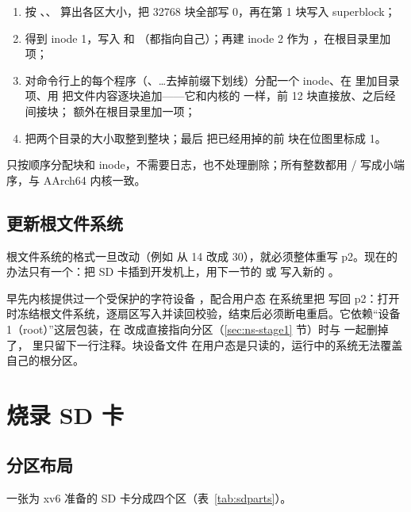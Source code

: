 \begin{enumerate}
  \item 按 、、 算出各区大小，把 32768 块全部写 0，再在第 1 块写入 superblock；
  \item {} 得到 inode 1，写入  和 （都指向自己）；再建 inode 2 作为 ，在根目录里加  项；
  \item 对命令行上的每个程序（、…去掉前缀下划线）分配一个 inode、在  里加目录项、用  把文件内容逐块追加——它和内核的  一样，前 12 块直接放、之后经间接块； 额外在根目录里加一项；
  \item 把两个目录的大小取整到整块；最后  把已经用掉的前  块在位图里标成 1。
\end{enumerate}

 只按顺序分配块和 inode，不需要日志，也不处理删除；所有整数都用 / 写成小端序，与 AArch64 内核一致。

\subsection{更新根文件系统}

根文件系统的格式一旦改动（例如  从 14 改成 30），就必须整体重写 p2。现在的办法只有一个：把 SD 卡插到开发机上，用下一节的  或  写入新的 。

早先内核提供过一个受保护的字符设备 ，配合用户态  在系统里把  写回 p2：打开时冻结根文件系统，逐扇区写入并读回校验，结束后必须断电重启。它依赖“设备 1（root）”这层包装，在  改成直接指向分区（\ref{sec:ns-stage1} 节）时与  一起删掉了， 里只留下一行注释。块设备文件  在用户态是只读的，运行中的系统无法覆盖自己的根分区。

\section{烧录 SD 卡}

\subsection{分区布局}

一张为 xv6 准备的 SD 卡分成四个区（表~\ref{tab:sdparts}）。

